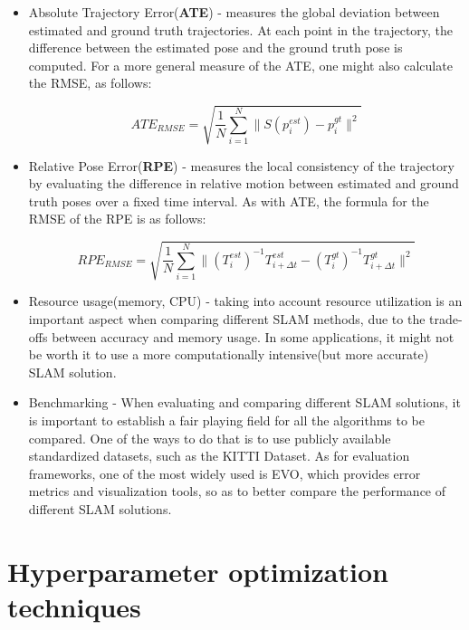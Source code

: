 \begin{itemize}
    \item Absolute Trajectory Error(\textbf{ATE}) - measures the global deviation between estimated and ground truth trajectories. At each point in the trajectory, the difference between the estimated pose and the ground truth pose is computed. For a more general measure of the ATE, one might also calculate the RMSE, as follows: 
    \begin{center} 
        \begin{equation} 
            ATE_{RMSE} = \sqrt{\frac{1}{N}\sum_{i=1}^{N}\|S(p_i^{est}) - p_i^{gt}\|^2}
        \end{equation}
    \end{center}
    \item Relative Pose Error(\textbf{RPE}) - measures the local consistency of the trajectory by evaluating the difference in relative motion between estimated and ground truth poses over a fixed time interval. As with ATE, the formula for the RMSE of the RPE is as follows:
    \begin{center}
        \begin{equation}
            RPE_{RMSE} = \sqrt{\frac{1}{N}\sum_{i=1}^{N}\|(T_i^{est})^{-1}T_{i+\Delta t}^{est} - (T_{i}^{gt})^{-1}T_{i+\Delta t}^{gt}\|^2}
        \end{equation}
    \end{center}
    \item Resource usage(memory, CPU) - taking into account resource utilization is an important aspect when comparing different SLAM methods, due to the trade-offs between accuracy and memory usage. In some applications, it might not be worth it to use a more computationally intensive(but more accurate) SLAM solution.
    \item Benchmarking - When evaluating and comparing different SLAM solutions, it is important to establish a fair playing field for all the algorithms to be compared. One of the ways to do that is to use publicly available standardized datasets, such as the KITTI Dataset. As for evaluation frameworks, one of the most widely used is EVO, which provides error metrics and visualization tools, so as to better compare the performance of different SLAM solutions.
\end{itemize}

\section{Hyperparameter optimization techniques}
